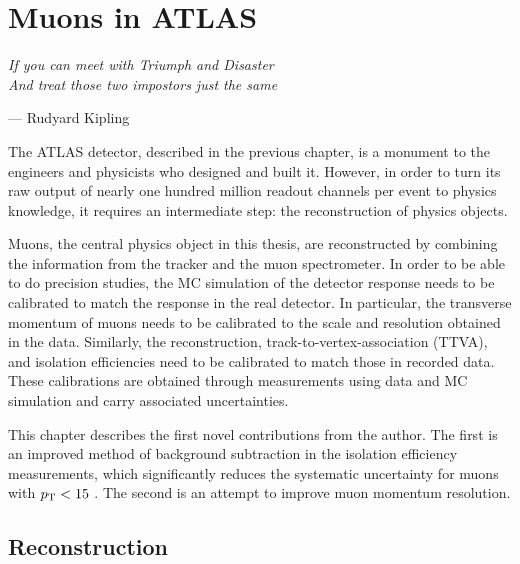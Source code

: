 \chapter{Muons in ATLAS}
\label{sec:muons}
  
\textit{If you can meet with Triumph and Disaster \\ And treat those two impostors just the same}
\vspace{5mm}
\begin{flushright}
--- Rudyard Kipling
\end{flushright}

\thispagestyle{empty}
\newpage
The ATLAS detector, described in the previous chapter, is a monument
to the engineers and physicists who designed and built it. However,
in order to turn its raw output of nearly one hundred million readout
channels per event to physics knowledge, it requires an intermediate step:
the reconstruction of physics objects.

Muons, the central physics object in this thesis, are reconstructed
by combining the information from the tracker and the muon spectrometer.
In order to be able to do precision studies, the MC
simulation of the detector response needs to be calibrated to match
the response in the real detector. In particular, the transverse momentum of
muons needs to be calibrated to the scale and resolution obtained in the data.
Similarly, the reconstruction, track-to-vertex-association (TTVA),
and isolation efficiencies need to be calibrated to match those in 
recorded data. These calibrations are obtained through measurements
using data and MC simulation and carry associated uncertainties.

This chapter describes the first novel contributions from the author.
The first is an improved method of background subtraction in the isolation
efficiency measurements, which significantly reduces the systematic
uncertainty for muons with $p_{\text{T}} < 15$ \GeV. The second is an attempt
to improve muon momentum resolution.

\section{Reconstruction}

